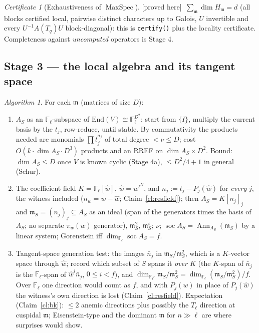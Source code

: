 \documentclass[11pt]{article}
\theoremstyle{remark}
\newtheorem{algorithm}[theorem]{Algorithm}
\newtheorem{certificate}[theorem]{Certificate}
\newcommand{\F}{\mathbb{F}}
\newcommand{\End}{\mathrm{End}}
\newcommand{\Fl}{\F_\ell}
\newcommand{\Flr}{\F_{\ell^r}}
\DeclareMathOperator{\soc}{soc}
\DeclareMathOperator{\Ann}{Ann}
\DeclareMathOperator{\MaxSpec}{MaxSpec}
\newcommand{\m}{\mathfrak{m}}
\newcommand{\PROVED}{\textsf{[proved here]}}
\begin{document}
\begin{certificate}[Exhaustiveness of $\MaxSpec$]\PROVED\
$\sum_\m\dim H_\m=d$ (all blocks certified local, pairwise distinct characters up to Galois,
$U$ invertible and every $U^{-1}A(T_q)U$ block-diagonal): this is \texttt{certify()} plus the
locality certificate. Completeness against \emph{uncomputed} operators is Stage 4.
\end{certificate}

\subsection*{Stage 3 --- the local algebra and its tangent space}
\begin{algorithm}\label{alg:stage3}
For each $\m$ (matrices of size $D$):
\begin{enumerate}
\item $A_S$ as an $\Fl$-subspace of $\End(V)\cong\Fl^{D^2}$: start from $\{I\}$, multiply the
  current basis by the $t_j$, row-reduce, until stable. By commutativity the products needed are
  monomials $\prod t_j^{a_j}$ of total degree $<\nu\le D$; cost
  $O(k\cdot\dim A_S\cdot D^3)$ products and an RREF on $\dim A_S\times D^2$. Bound:
  $\dim A_S\le D$ once $V$ is known cyclic (Stage 4a), $\le D^2/4+1$ in general (Schur).
\item The coefficient field $K=\Fl[\hat w]$, $\hat w=w^{\ell^N}$, and
  $n_j:=t_j-P_j(\hat w)$ for \emph{every} $j$, the witness included ($n_w=w-\hat w$;
  Claim~\ref{cl:resfield}); then $A_S=K[n_j]_j$ and $\m_S=(n_j)_j\subseteq A_S$ as an ideal
  (span of the generators times the basis of $A_S$; no separate $\pi_w(w)$ generator), $\m_S^2$,
  $\m_S^i$; $\nu$; $\soc A_S=\Ann_{A_S}(\m_S)$ by a linear system; Gorenstein iff
  $\dim_{\Fl}\soc A_S=f$.
\item Tangent-space generation test: the images $\bar n_j$ in $\m_S/\m_S^2$, which is a
  $K$-vector space through $\hat w$; record which subset of $S$ spans it \emph{over $K$} (the
  $K$-span of $\bar n_j$ is the $\Fl$-span of $\hat w^i\bar n_j$, $0\le i<f$), and
  $\dim_{\Flr}\m_S/\m_S^2=\dim_{\Fl}(\m_S/\m_S^2)/f$. Over $\Fl$ one direction would count as $f$,
  and with $P_j(w)$ in place of $P_j(\hat w)$ the witness's own direction is lost
  (Claim~\ref{cl:resfield}). Expectation (Claim~\ref{cl:bk}):
  $\le2$ anemic directions plus possibly the $T_\ell$ direction at cuspidal $\m$; Eisenstein-type
  and the dominant $\m$ for $n\gg\ell$ are where surprises would show.
\end{enumerate}
\end{algorithm}
\end{document}
